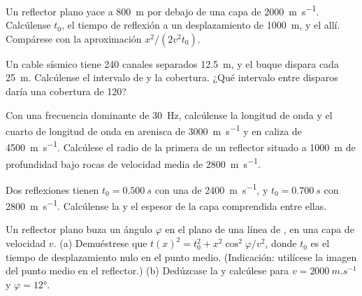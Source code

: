 \begin{exercise}[$\star$]\label{exo:b3:exploration-seismology:2}
Un reflector plano yace a \qty{800}{m} por debajo de una capa de \qty{2000}{m.s^{-1}}.
Calcúlense $t_0$, el tiempo de reflexión a un desplazamiento de \qty{1000}{m}, y el
 allí. Compárese con la aproximación $x^2/(2v^2t_0)$.
\end{exercise}

\begin{exercise}[$\star$]\label{exo:b3:exploration-seismology:3}
Un cable sísmico tiene 240 canales separados \qty{12.5}{m}, y el buque dispara cada
\qty{25}{m}. Calcúlense el intervalo de  y la cobertura. ¿Qué intervalo
entre disparos daría una cobertura de 120?
\end{exercise}

\begin{exercise}[$\star$]\label{exo:b3:exploration-seismology:4}
Con una frecuencia dominante de \qty{30}{Hz}, calcúlense la longitud de onda y el
cuarto de longitud de onda en arenisca de \qty{3000}{m.s^{-1}} y en caliza de
\qty{4500}{m.s^{-1}}. Calcúlese el radio de la primera  de un
reflector situado a \qty{1000}{m} de profundidad bajo rocas de velocidad media de \qty{2800}{m.s^{-1}}.
\end{exercise}

\begin{exercise}[$\star\star$]\label{exo:b3:exploration-seismology:5}
Dos reflexiones tienen $t_0 = \qty{0.500}{s}$ con una  de
\qty{2400}{m.s^{-1}}, y $t_0 = \qty{0.700}{s}$ con \qty{2800}{m.s^{-1}}.
Calcúlense la  y el espesor de la capa comprendida entre ellas.
\end{exercise}

\begin{exercise}[$\star\star$]\label{exo:b3:exploration-seismology:6}
Un reflector plano buza un ángulo $\varphi$ en el plano de una línea de , en una capa de
velocidad $v$. (a) Demuéstrese que $t(x)^2 = t_0^2 + x^2\cos^2\varphi/v^2$, donde $t_0$ es
el tiempo de desplazamiento nulo en el punto medio. (Indicación: utilícese la imagen del punto medio en
el reflector.) (b) Dedúzcase la  y calcúlese para
$v = \qty{2000}{m.s^{-1}}$ y $\varphi = \ang{12}$.
\end{exercise}

